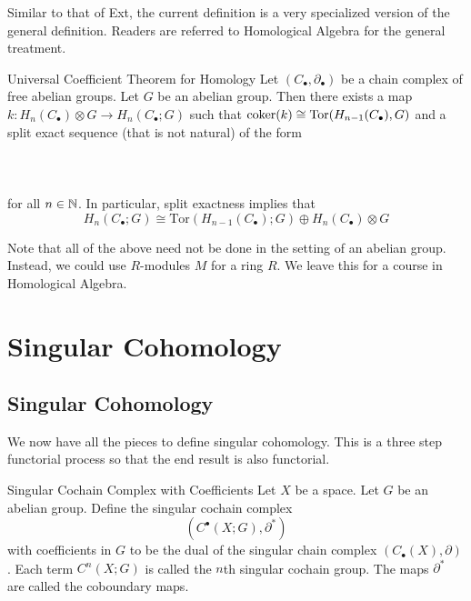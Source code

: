 \documentclass[a4paper]{article}
\begin{document}
Similar to that of Ext, the current definition is a very specialized version of the general definition. Readers are referred to Homological Algebra for the general treatment. 

\begin{thm}{Universal Coefficient Theorem for Homology}{} Let $(C_\bullet,\partial_\bullet)$ be a chain complex of free abelian groups. Let $G$ be an abelian group. Then there exists a map $k:H_n(C_\bullet)\otimes G\to H_n(C_\bullet;G)$ such that $\operatorname{coker}(k)\cong\text{Tor}(H_{n-1}(C_\bullet),G)$ and a split exact sequence (that is not natural) of the form \\~\\
\\~\\
for all $n\in\mathbb{N}$. In particular, split exactness implies that $$H_n(C_\bullet;G)\cong\text{Tor}(H_{n-1}(C_\bullet);G)\oplus H_n(C_\bullet)\otimes G$$
\end{thm}

Note that all of the above need not be done in the setting of an abelian group. Instead, we could use $R$-modules $M$ for a ring $R$. We leave this for a course in Homological Algebra. 

\pagebreak
\section{Singular Cohomology}
\subsection{Singular Cohomology}
We now have all the pieces to define singular cohomology. This is a three step functorial process so that the end result is also functorial. 

\begin{defn}{Singular Cochain Complex with Coefficients}{} Let $X$ be a space. Let $G$ be an abelian group. Define the singular cochain complex $$(C^\bullet(X;G),\partial^\ast)$$ with coefficients in $G$ to be the dual of the singular chain complex $(C_\bullet(X),\partial)$. Each term $C^n(X;G)$ is called the $n$th singular cochain group. The maps $\partial^\ast$ are called the coboundary maps. 
\end{defn}
\end{document}
